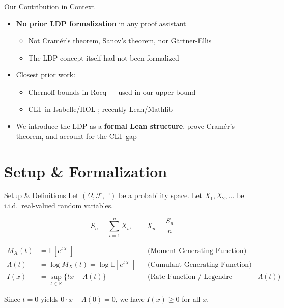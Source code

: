 \documentclass[aspectratio=169]{beamer}
\newcommand{\E}{\mathbb{E}}
\renewcommand{\P}{\mathbb{P}}
\newcommand{\R}{\mathbb{R}}
\begin{document}
\begin{frame}{Our Contribution in Context}
  \begin{itemize}
    \item \textbf{No prior LDP formalization} in any proof assistant
      \begin{itemize}
        \item Not Cram\'er's theorem, Sanov's theorem, nor G\"artner-Ellis
        \item The LDP concept itself had not been formalized
      \end{itemize}
      \vspace{0.3cm}
    \item Closest prior work:
      \begin{itemize}
        \item Chernoff bounds in Rocq \cite{affeldt2025concentration} --- used in our upper bound
        \item CLT in Isabelle/HOL \cite{avigad2017clt}; recently Lean/Mathlib \cite{marion2026clt}
      \end{itemize}
      \vspace{0.3cm}
    \item We introduce the LDP as a \textbf{formal Lean structure}, prove Cram\'er's theorem,
      and account for the CLT gap
  \end{itemize}
\end{frame}

\section{Setup \& Formalization}

\begin{frame}{Setup \& Definitions}
  Let $(\Omega, \mathcal{F}, \P)$ be a probability space.
  Let $X_1, X_2, \dots$ be i.i.d.\ real-valued random variables.

  \begin{definition}
    \[
      S_n = \sum_{i=1}^{n} X_i, \qquad \overline{X}_n = \frac{S_n}{n}
    \]
  \end{definition}

  \begin{definition}
    \begin{align*}
      M_X(t) &= \E[e^{tX_1}] & &\text{(Moment Generating Function)} \\
      \Lambda(t) &= \log M_X(t) = \log \E[e^{tX_1}] & &\text{(Cumulant Generating Function)} \\
      I(x) &= \sup_{t \in \R}\{tx - \Lambda(t)\} & &\text{(Rate Function / Legendre Transform of $\Lambda(t)$)}
    \end{align*}
  \end{definition}
  Since $t=0$ yields $0 \cdot x - \Lambda(0) = 0$, we have $I(x) \ge 0$ for all $x$.
\end{frame}
\end{document}
